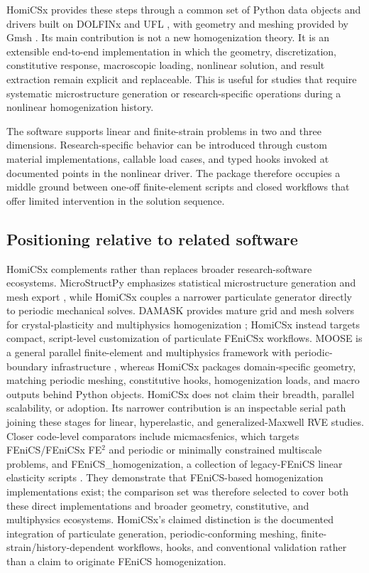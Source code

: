 \documentclass[preprint,12pt]{elsarticle}
\begin{document}
HomiCSx provides these steps through a common set of Python data objects and
drivers built on DOLFINx and UFL \cite{dolfinx2025,ufl2014}, with geometry and
meshing provided by Gmsh \cite{gmsh2009}. Its main contribution is not a new
homogenization theory. It is an extensible end-to-end implementation in which
the geometry, discretization, constitutive response, macroscopic loading,
nonlinear solution, and result extraction remain explicit and replaceable.
This is useful for studies that require systematic microstructure generation
or research-specific operations during a nonlinear homogenization history.

The software supports linear and finite-strain problems in two and three
dimensions. Research-specific behavior can be introduced through custom
material implementations, callable load cases, and typed hooks invoked at
documented points in the nonlinear driver. The package therefore occupies a
middle ground between one-off finite-element scripts and closed workflows that
offer limited intervention in the solution sequence.

\subsection{Positioning relative to related software}

HomiCSx complements rather than replaces broader research-software ecosystems.
MicroStructPy emphasizes statistical microstructure generation and mesh export
\cite{microstructpy2020}, while HomiCSx couples a narrower particulate generator
directly to periodic mechanical solves. DAMASK provides mature grid and mesh
solvers for crystal-plasticity and multiphysics homogenization
\cite{damask2020}; HomiCSx instead targets compact, script-level customization
of particulate FEniCSx workflows. MOOSE is a general parallel finite-element
and multiphysics framework with periodic-boundary infrastructure
\cite{moose2020}, whereas HomiCSx packages domain-specific geometry, matching
periodic meshing, constitutive hooks, homogenization loads, and macro outputs
behind Python objects. HomiCSx does not claim their breadth, parallel
scalability, or adoption. Its narrower contribution is an inspectable serial
path joining these stages for linear, hyperelastic, and generalized-Maxwell
RVE studies. Closer code-level comparators include micmacsfenics, which targets
FEniCS/FEniCSx FE$^2$ and periodic or minimally constrained multiscale
problems, and FEniCS\_homogenization, a collection of legacy-FEniCS linear
elasticity scripts \cite{micmacsfenics,fenicshomogenization}. They demonstrate
that FEniCS-based homogenization implementations exist; the comparison set was
therefore selected to cover both these direct implementations and broader
geometry, constitutive, and multiphysics ecosystems. HomiCSx's claimed
distinction is the documented integration of particulate generation,
periodic-conforming meshing, finite-strain/history-dependent workflows, hooks,
and conventional validation rather than a claim to originate FEniCS
homogenization.
\end{document}
